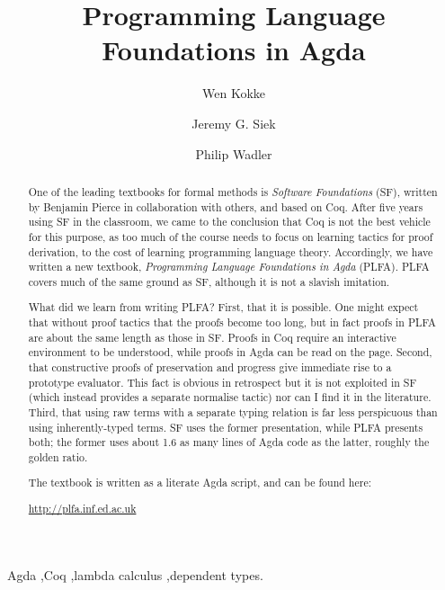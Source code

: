 \documentclass[preprint,authoryear]{elsarticle}
\begin{document}
\title{Programming Language Foundations in Agda}

\author[adr1]{Wen Kokke}
\author[adr2]{Jeremy G. Siek}
\author[adr1]{Philip Wadler}

\address[adr1]{University of Edinburgh, 10 Crichton Street, EH8 9AB, Edinburgh}
\address[adr2]{Indiana University, 700 N Woodlawn Ave, Bloomington, IN 47408, USA}

\begin{abstract}

  One of the leading textbooks for formal methods is \emph{Software
    Foundations} (SF), written by Benjamin Pierce in collaboration
  with others, and based on Coq. After five years using SF in the
  classroom, we came to the conclusion that Coq is not the best
  vehicle for this purpose, as too much of the course needs to focus
  on learning tactics for proof derivation, to the cost of learning
  programming language theory.  Accordingly, we have written a new
  textbook, \emph{Programming Language Foundations in Agda}
  (PLFA). PLFA covers much of the same ground as SF, although it is
  not a slavish imitation.

  What did we learn from writing PLFA? First, that it is possible. One
  might expect that without proof tactics that the proofs become too
  long, but in fact proofs in PLFA are about the same length as those
  in SF. Proofs in Coq require an interactive environment to be
  understood, while proofs in Agda can be read on the page.  Second,
  that constructive proofs of preservation and progress give immediate
  rise to a prototype evaluator. This fact is obvious in retrospect
  but it is not exploited in SF (which instead provides a separate
  normalise tactic) nor can I find it in the literature.  Third, that
  using raw terms with a separate typing relation is far less
  perspicuous than using inherently-typed terms. SF uses the former
  presentation, while PLFA presents both; the former uses about 1.6 as
  many lines of Agda code as the latter, roughly the golden ratio.

  The textbook is written as a literate Agda script, and can be found
  here:
  \begin{center}
    \url{http://plfa.inf.ed.ac.uk}
  \end{center}
\end{abstract}

\begin{keyword}
  Agda \sep Coq \sep lambda calculus \sep dependent types.  
\end{keyword}
\end{document}
